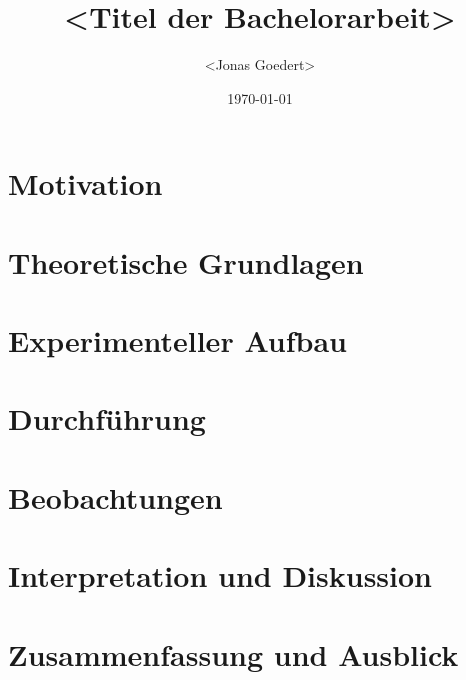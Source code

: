 \documentclass[12pt,a4paper]{scrartcl}
\title{<Titel der Bachelorarbeit>}
\author{<Jonas Goedert>}
\date{\today}
\begin{document}
\maketitle

\begin{abstract}

\end{abstract}

\tableofcontents
\newpage

\section{Motivation}


\section{Theoretische Grundlagen}


\section{Experimenteller Aufbau}


\section{Durchführung}


\section{Beobachtungen}


\section{Interpretation und Diskussion}


\section{Zusammenfassung und Ausblick}


\printglossaries %

\end{document}
